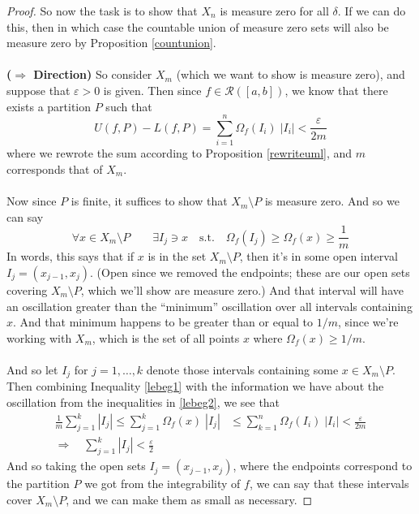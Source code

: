 \documentclass[12pt]{article}
\theoremstyle{plain}
\theoremstyle{definition}
\theoremstyle{remark}
\begin{document}
\begin{proof}
So now the task is to show that $X_n$ is measure zero for all $\delta$. If we can do this, then in which case the countable union of measure zero sets will also be measure zero by Proposition \ref{countunion}.
\\
\\
\textbf{($\Rightarrow$ Direction)} So consider $X_m$ (which we want to show is measure zero), and suppose that $\varepsilon>0$ is given. Then since $f\in\mathscr{R}([a,b])$, we know that there exists a partition $P$ such that
\begin{equation}
    \label{lebeg1}
    U(f,P) - L(f,P) = 
    \sum^n_{i=1} \Omega_f(I_i)\; |I_i| < \frac{\varepsilon}{2m} 
\end{equation}
where we rewrote the sum according to Proposition \ref{rewriteuml}, and $m$ corresponds that of $X_m$.
\\
\\
Now since $P$ is finite, it suffices to show that $X_m\setminus P$ is measure zero. And so we can say
\begin{equation}
    \label{lebeg2}
    \forall x \in X_m \setminus P \qquad
    \exists I_{j} \ni x \quad \text{s.t.} \quad
    \Omega_f(I_j) \geq \Omega_f(x) \geq \frac{1}{m}
\end{equation}
In words, this says that if $x$ is in the set $X_m\setminus P$, then it's in some open interval $I_j = (x_{j-1}, x_j)$. (Open since we removed the endpoints; these are our open sets covering $X_m\setminus P$, which we'll show are measure zero.) And that interval will have an oscillation greater than the ``minimum'' oscillation over all intervals containing $x$. And that minimum happens to be greater than or equal to $1/m$, since we're working with $X_m$, which is the set of all points $x$ where $\Omega_f(x)\geq 1/m$.
\\
\\
And so let $I_{j}$ for $j=1,\ldots,k$ denote those intervals containing some $x\in X_m\setminus P$. Then combining Inequality \ref{lebeg1} with the information we have about the oscillation from the inequalities in \ref{lebeg2}, we see that
\begin{align*}
    \frac{1}{m} \sum^k_{j=1} |I_j| \leq 
    \sum^k_{j=1} \Omega_f(x)\; |I_j| &\leq 
    \sum^n_{k=1} \Omega_f(I_i)\; |I_i| < \frac{\varepsilon}{2m} \\
    \Rightarrow \quad 
    \sum^k_{j=1} |I_j| < \frac{\varepsilon}{2}
\end{align*}
And so taking the open sets $I_j = (x_{j-1}, x_j)$, where the endpoints correspond to the partition $P$ we got from the integrability of $f$, we can say that these intervals cover $X_m\setminus P$, and we can make them as small as necessary. 


\end{proof}
\end{document}
